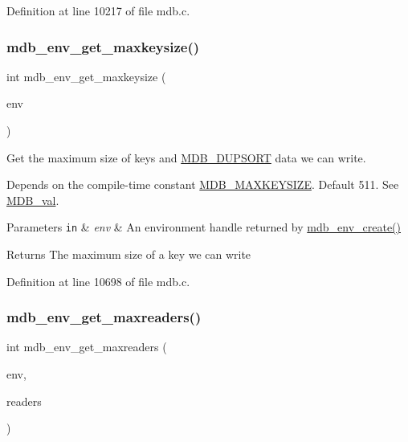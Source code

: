 Definition at line 10217 of file mdb.\+c.

\mbox{\label{group__mdb_gaaf0be004f33828bf2fb09d77eb3cef94}} 
\subsubsection{\texorpdfstring{mdb\+\_\+env\+\_\+get\+\_\+maxkeysize()}{mdb\_env\_get\_maxkeysize()}}
{\footnotesize\ttfamily int mdb\+\_\+env\+\_\+get\+\_\+maxkeysize (\begin{DoxyParamCaption}\item[{\mbox{\hyperlink{struct_m_d_b__env}{M\+D\+B\+\_\+env}} $\ast$}]{env }\end{DoxyParamCaption})}



Get the maximum size of keys and \mbox{\hyperlink{group__mdb__dbi__open_gae0626566c2562e9007f5c8c9535bab1a}{M\+D\+B\+\_\+\+D\+U\+P\+S\+O\+RT}} data we can write. 

Depends on the compile-\/time constant \mbox{\hyperlink{group__internal_gac929399f5d93cef85f874b9e9b1d09e0}{M\+D\+B\+\_\+\+M\+A\+X\+K\+E\+Y\+S\+I\+ZE}}. Default 511. See \mbox{\hyperlink{struct_m_d_b__val}{M\+D\+B\+\_\+val}}. 
\begin{DoxyParams}[1]{Parameters}
\mbox{\tt in}  & {\em env} & An environment handle returned by \mbox{\hyperlink{group__mdb_gaad6be3d8dcd4ea01f8df436f41d158d4}{mdb\+\_\+env\+\_\+create()}} \\
\hline
\end{DoxyParams}
\begin{DoxyReturn}{Returns}
The maximum size of a key we can write 
\end{DoxyReturn}


Definition at line 10698 of file mdb.\+c.

\mbox{\label{group__mdb_ga70e143cf11760d869f754c9c9956e6cc}} 
\subsubsection{\texorpdfstring{mdb\+\_\+env\+\_\+get\+\_\+maxreaders()}{mdb\_env\_get\_maxreaders()}}
{\footnotesize\ttfamily int mdb\+\_\+env\+\_\+get\+\_\+maxreaders (\begin{DoxyParamCaption}\item[{\mbox{\hyperlink{struct_m_d_b__env}{M\+D\+B\+\_\+env}} $\ast$}]{env,  }\item[{unsigned int $\ast$}]{readers }\end{DoxyParamCaption})}



